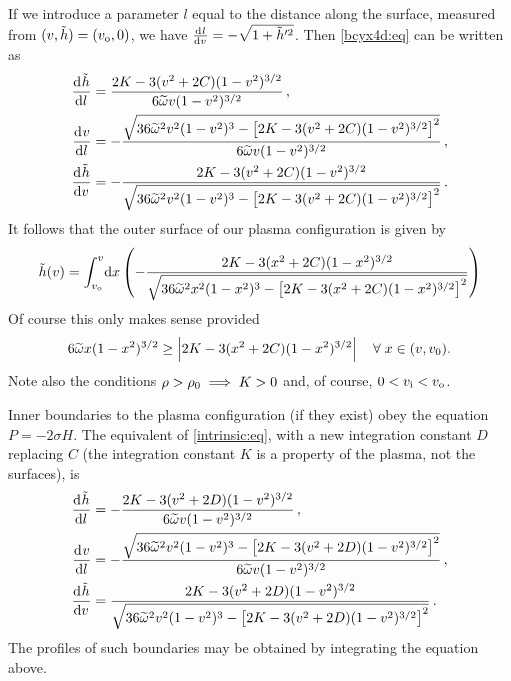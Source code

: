 If we introduce a parameter $l$ equal to the distance along the
surface, measured from $(v,\tilde h)=(v_\mathrm{o},0)$, we have
$\diff{l}{v}=-\sqrt{1+\g'^2}$. Then \eqref{bcyx4d:eq} can be written
as
%
\begin{equation}\label{intrinsic:eq}
\begin{split}
  \diff{\g}{l} &= \frac{2K-3(v^2+2C)(1-v^2)^{3/2}}
                            {6\tw v(1-v^2)^{3/2}}\,,\\
  \diff{v}{l} &= -\frac{\sqrt{36\tw^2v^2(1-v^2)^3
                           - \brk{2K - 3(v^2+2C)(1-v^2)^{3/2}}^2}}
                     {6\tw v (1-v^2)^{3/2}}\,,\\
  \diff{\g}{v} &= -\frac{2K-3(v^2+2C)(1-v^2)^{3/2}}
                     {\sqrt{36\tw^2v^2(1-v^2)^3
                           - \brk{2K - 3(v^2+2C)(1-v^2)^{3/2}}^2}}\,.\\
\end{split}
\end{equation}
%
It follows that the outer surface of our plasma configuration is
given by
%
\begin{equation}\label{profile:eq}
  \tilde h(v)= \int_{v_\mathrm{o}}^v \!\mathrm{d} x \left(  -\frac{2K-3(x^2+2C)(1-x^2)^{3/2}}
                     {\sqrt{36\widetilde{\omega}^2x^2(1-x^2)^3
                           - \left [ 2K - 3(x^2+2C)(1-x^2)^{3/2} \right ]^2}}
                           \right)
\end{equation}
%
Of course this only makes sense provided
%
\begin{equation}\label{sense:eq}
  6\widetilde{\omega} x(1-x^2)^{3/2} \geq \left | 2K - 3(x^2+2C)(1-x^2)^{3/2} \right |
  \quad \forall\; x \in (v, v_0).
\end{equation}
%
Note also the conditions $\rho>\rho_0 \implies K>0$ and, of course,
$0<v_\mathrm{i}<v_\mathrm{o}$.


Inner boundaries to the plasma configuration (if they exist) obey
the equation $P=-2\sigma H$. The equivalent of \eqref{intrinsic:eq},
with a new integration constant $D$ replacing $C$ (the integration
constant $K$ is a property of the plasma, not the surfaces), is
%
\begin{equation}\label{innerbnd:eq}
\begin{split}
  \diff{\g}{l} &= -\frac{2K-3(v^2+2D)(1-v^2)^{3/2}}
                            {6\tw v(1-v^2)^{3/2}}\,,\\
  \diff{v}{l} &= -\frac{\sqrt{36\tw^2v^2(1-v^2)^3
                           - \brk{2K - 3(v^2+2D)(1-v^2)^{3/2}}^2}}
                     {6\tw v (1-v^2)^{3/2}}\,,\\
  \diff{\g}{v} &= \frac{2K-3(v^2+2D)(1-v^2)^{3/2}}
                     {\sqrt{36\tw^2v^2(1-v^2)^3
                           - \brk{2K - 3(v^2+2D)(1-v^2)^{3/2}}^2}}\,.\\
\end{split}
\end{equation}
%
The profiles of such boundaries may be obtained by integrating the
equation above.

